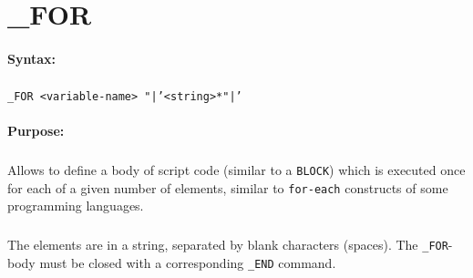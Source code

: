 
\newpage
\section{\_FOR}
\label{cmd:_FOR}

\paragraph{Syntax:}
\subparagraph{}
\texttt{\_FOR <variable-name> "|'<string>*"|'}

\paragraph{Purpose:}
\subparagraph{}
Allows to define a body of script code (similar to a \texttt{BLOCK}) which 
is executed once for each of a given number of elements, similar to 
\texttt{for-each} constructs of some programming languages.

\subparagraph{}
The elements are in a string, separated by blank characters (spaces). The 
\texttt{\_FOR}-body must be closed with a corresponding \texttt{\_END} command.

